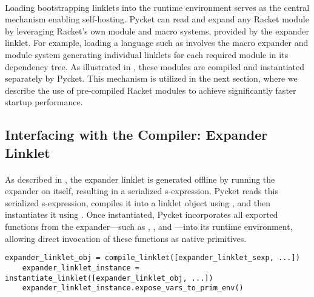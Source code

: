 
		\paragraph{}%
			Loading bootstrapping linklets into the runtime environment serves as the central mechanism enabling self-hosting. Pycket can read and expand any Racket module by leveraging Racket's own module and macro systems, provided by the expander linklet. For example, loading a language such as  involves the macro expander and module system generating individual linklets for each required module in its dependency tree. As illustrated in , these modules are compiled and instantiated separately by Pycket. This mechanism is utilized in the next section, where we describe the use of pre-compiled Racket modules to achieve significantly faster startup performance.

		\subsection{Interfacing with the Compiler: Expander Linklet}

			\paragraph{}%
				As described in , the expander linklet is generated offline by running the expander on itself, resulting in a serialized s-expression. Pycket reads this serialized s-expression, compiles it into a linklet object using , and then instantiates it using . Once instantiated, Pycket incorporates all exported functions from the expander—such as , , and —into its runtime environment, allowing direct invocation of these functions as native primitives.

			\begin{center}
				\begin{minipage}{0.7\textwidth}
					\begin{lstlisting}[style=inline-python,frame=lines,numbers=none]
	expander_linklet_obj = compile_linklet([expander_linklet_sexp, ...])
	expander_linklet_instance = instantiate_linklet([expander_linklet_obj, ...])
	expander_linklet_instance.expose_vars_to_prim_env()\end{lstlisting}
				\end{minipage}
			\end{center}

